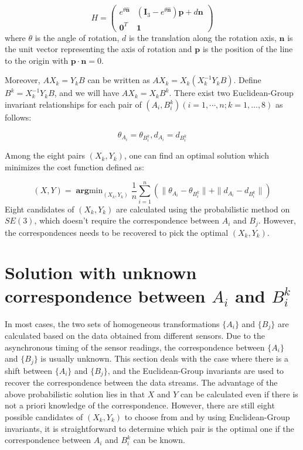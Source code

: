 \documentclass[letterpaper, 10 pt, conference]{ieeeconf}  %
\begin{document}
\begin{equation}\label{equ21}
H = \left( \begin{array}{cc}
       e^{\theta \hat{\mathbf{n}}} & (\mathbf{I}_{3} - e^{\theta \hat{\mathbf{n}}})\mathbf{p} + d\mathbf{n} \\
       \mathbf{0}^{T} & \mathbf{1}
\end{array} \right)
\end{equation}
where $\theta$ is the angle of rotation, $d$ is the translation along the rotation axis, $\mathbf{n}$ is the unit vector representing the axis of rotation and $\mathbf{p}$ is the position of the line to the origin with $\mathbf{p} \cdot \mathbf{n} = 0$.

Moreover, $A X_k = Y_k B$ can be written as $AX_k=X_k(X_k^{-1}Y_kB)$. Define $B^k = X_k^{-1}Y_kB$, and we will have $AX_k=X_kB^k$. There exist two Euclidean-Group invariant relationships for each pair of $(A_{i},B_{i}^k)( i = 1,\cdots,n; k=1,\dots,8)$ as follows:

\begin{equation}\label{equ22}
    \theta_{A_{i}}=\theta_{B_{i}^{k}}, d_{A_{i}}=d_{B_{i}^{k}}
\end{equation}

Among the eight pairs $(X_{k},Y_{k})$, one can find an optimal solution which  minimizes the cost function defined as:

\begin{equation}\label{equ23}
    (X,Y) = \mathop{\mathbf{arg}min}_{(X_{k},Y_{k})}\frac{1}{n} \sum_{i=1}^{n} (\parallel \theta_{A_{i}}-\theta_{B_{i}^{k}} \parallel + \parallel d_{A_{i}}-d_{B_{i}^{k}} \parallel)
\end{equation}
Eight candidates of $(X_k, Y_k)$ are calculated using the probabilistic method on $SE(3)$, which doesn't require the correspondence between $A_{i}$ and $B_{j}$. However,
the correspondences needs to be recovered to pick the optimal $(X_k, Y_k)$.
\section{Solution with unknown correspondence between $A_{i}$ and $B_{i}^{k}$}
\label{sect3}

In most cases, the two sets of homogeneous transformations  $\{A_i\}$ and $\{B_j\}$ are calculated based on the data obtained from different sensors. Due to the asynchronous timing of the sensor readings, the correspondence between $\{A_{i}\}$ and $\{B_{j}\}$ is usually unknown. This section deals with the case where there is a shift between $\{A_i\}$ and $\{B_j\}$, and the Euclidean-Group invariants are used to recover the correspondence between the data streams. The advantage of the above probabilistic solution lies in that $X$ and $Y$ can be calculated even if there is not a priori knowledge of the correspondence. However, there are still eight possible candidates of $(X_{k},Y_{k})$ to choose from and by using Euclidean-Group invariants, it is straightforward to determine which pair is the optimal one if the correspondence between $A_{i}$ and $B_{i}^{k}$ can be known.
\end{document}
